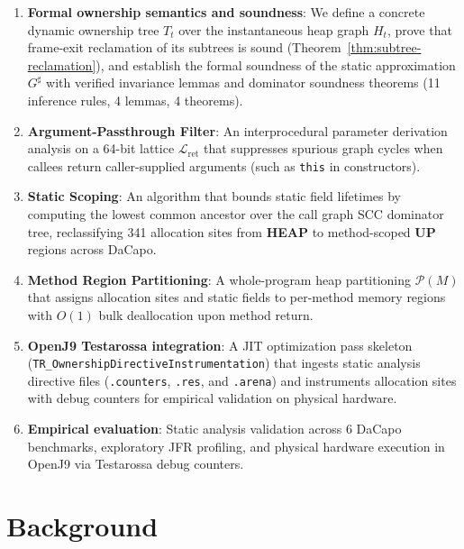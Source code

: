\documentclass[12pt,a4paper]{article}
\newcommand{\UP}{\textbf{UP}}
\newcommand{\HEAP}{\textbf{HEAP}}
\begin{document}
\begin{enumerate}
  \item \textbf{Formal ownership semantics and soundness}: We define a concrete dynamic ownership tree $T_t$ over the instantaneous heap graph $H_t$, prove that frame-exit reclamation of its subtrees is sound (Theorem~\ref{thm:subtree-reclamation}), and establish the formal soundness of the static approximation $G^\sharp$ with verified invariance lemmas and dominator soundness theorems (11 inference rules, 4 lemmas, 4 theorems).

  \item \textbf{Argument-Passthrough Filter}: An interprocedural parameter derivation analysis on a 64-bit lattice $\mathcal{L}_{\text{ret}}$ that suppresses spurious graph cycles when callees return caller-supplied arguments (such as \texttt{this} in constructors).

  \item \textbf{Static Scoping}: An algorithm that bounds static field lifetimes by computing the lowest common ancestor over the call graph SCC dominator tree, reclassifying 341 allocation sites from \HEAP{} to method-scoped \UP{} regions across DaCapo.
  
  \item \textbf{Method Region Partitioning}: A whole-program heap partitioning $\mathcal{P}(M)$ that assigns allocation sites and static fields to per-method memory regions with $O(1)$ bulk deallocation upon method return.

  \item \textbf{OpenJ9 Testarossa integration}: A JIT optimization pass skeleton (\texttt{TR\_}\allowbreak\texttt{Ownership}\allowbreak\texttt{Directive}\allowbreak\texttt{Instrumentation}) that ingests static analysis directive files (\texttt{.counters}, \texttt{.res}, and \texttt{.arena}) and instruments allocation sites with debug counters for empirical validation on physical hardware.
  
  \item \textbf{Empirical evaluation}: Static analysis validation across 6 DaCapo benchmarks, exploratory JFR profiling, and physical hardware execution in OpenJ9 via Testarossa debug counters.
\end{enumerate}

\section{Background}
\end{document}
